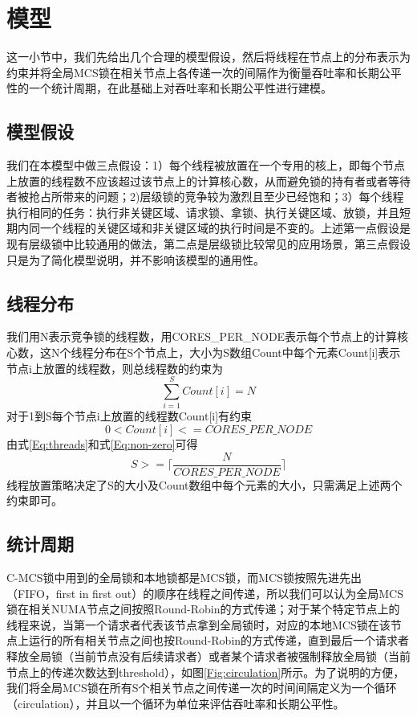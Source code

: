 \section{模型}
这一小节中，我们先给出几个合理的模型假设，然后将线程在节点上的分布表示为约束并将全局MCS锁在相关节点上各传递一次的间隔作为衡量吞吐率和长期公平性的一个统计周期，在此基础上对吞吐率和长期公平性进行建模。
\subsection{模型假设}
我们在本模型中做三点假设：1）每个线程被放置在一个专用的核上，即每个节点上放置的线程数不应该超过该节点上的计算核心数，从而避免锁的持有者或者等待者被抢占所带来的问题；2)层级锁的竞争较为激烈且至少已经饱和；3）每个线程执行相同的任务：执行非关键区域、请求锁、拿锁、执行关键区域、放锁，并且短期内同一个线程的关键区域和非关键区域的执行时间是不变的。上述第一点假设是现有层级锁中比较通用的做法，第二点是层级锁比较常见的应用场景，第三点假设只是为了简化模型说明，并不影响该模型的通用性。
\subsection{线程分布}
我们用N表示竞争锁的线程数，用CORES\_PER\_NODE表示每个节点上的计算核心数，这N个线程分布在S个节点上，大小为S数组Count中每个元素Count[i]表示节点i上放置的线程数，则总线程数的约束为
\begin{equation}\label{Eq:threads}
  \sum_{i=1}^{S} Count[i] = N
\end{equation}
对于1到S每个节点i上放置的线程数Count[i]有约束
\begin{equation}\label{Eq:non-zero}
  0 < Count[i] <= CORES\_PER\_NODE
\end{equation}
由式\ref{Eq:threads}和式\ref{Eq:non-zero}可得
\begin{equation}\label{Eq:S}
  S >= \lceil\frac{N}{CORES\_PER\_NODE}\rceil
\end{equation}
线程放置策略决定了S的大小及Count数组中每个元素的大小，只需满足上述两个约束即可。

\subsection{统计周期}
C-MCS锁中用到的全局锁和本地锁都是MCS锁，而MCS锁按照先进先出（FIFO，first in first out）的顺序在线程之间传递，所以我们可以认为全局MCS锁在相关NUMA节点之间按照Round-Robin的方式传递；对于某个特定节点上的线程来说，当第一个请求者代表该节点拿到全局锁时，对应的本地MCS锁在该节点上运行的所有相关节点之间也按Round-Robin的方式传递，直到最后一个请求者释放全局锁（当前节点没有后续请求者）或者某个请求者被强制释放全局锁（当前节点上的传递次数达到threshold），如图\ref{Fig:circulation}所示。为了说明的方便，我们将全局MCS锁在所有S个相关节点之间传递一次的时间间隔定义为一个循环（circulation），并且以一个循环为单位来评估吞吐率和长期公平性。

